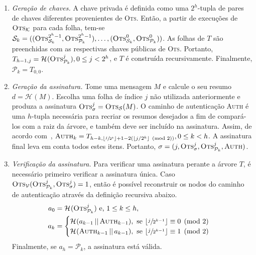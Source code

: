 \documentclass[12pt]{report}
\newcommand{\pk}{$\mathcal{P}_k$}
\newcommand{\sk}{$\mathcal{S}_k$}
\newcommand{\hash}[2][]{\mathcal{H}^{#1}(#2)}
\newcommand{\concat}{\, \vert \vert \,}
\begin{document}
\begin{enumerate}

    \item[] \emph{Geração de chaves.} A chave privada é definida como uma $2^{h}$-tupla
    de pares de chaves diferentes provenientes de \textsc{Ots}. Então, a partir de execuções de $\textsc{Ots}_\mathcal{K}$ para cada folha, tem-se $\text{\sk{}} = ((\textsc{Ots}_{\text{\sk{}}}^{2^{h} - 1}, \textsc{Ots}_{\text{\pk{}}}^{2^{h} - 1}), \dots, (\textsc{Ots}_{\text{\sk{}}}^{0}, \textsc{Ots}_{\text{\pk{}}}^{0}))$. As folhas de $T$ são preenchidas com as respectivas chaves públicas de \textsc{Ots}. Portanto, $T_{h - 1, j} = \hash{\textsc{Ots}_{\text{\pk{}}}^{j}}, 0 \leq j < 2^{h}$, e $T$ é construída recursivamente. Finalmente, $\text{\pk{}} = T_{0,0}$.
    
    \item[] \emph{Geração da assinatura.} Tome uma mensagem $M$ e calcule o seu resumo $d = \hash{M}$. Escolha
    uma folha de índice $j$ não utilizada anteriormente e produza a assinatura $\textsc{Ots}_\sigma^{j} = \textsc{Ots}_\mathcal{S}(M)$. O caminho de autenticação \textsc{Auth} é uma $h$-tupla necessária para recriar os resumos desejados a fim de compará-los com a raiz da árvore, e também deve ser incluído na assinatura. Assim, de acordo com~\cite{Bernstein:2008:PQC:1522375}, $\textsc{Auth}_k = T_{h - k, \lfloor \sfrac{j}{2^k} \rfloor + 1 - 2 (\lfloor j/2^k \rfloor \pmod{2})}, 0 \leq k < h$. A assinatura final leva em conta todos estes itens. Portanto, $\sigma = (j, \textsc{Ots}_\sigma^{j}, \textsc{Ots}_\text{\pk{}}^{j}, \textsc{Auth})$.
    
    \item[] \emph{Verificação da assinatura.} Para verificar uma assinatura perante a árvore $T$, é necessário primeiro verificar a assinatura única. Caso $\textsc{Ots}_{\mathcal{V}}(\textsc{Ots}_\text{\pk{}}^{j}, \textsc{Ots}_{\sigma}^{j}) = 1$, então é possível reconstruir os nodos do caminho de autenticação através da definição recursiva abaixo.
    \begin{equation}
        \begin{split}
        a_{0} &= \hash{\textsc{Ots}_\text{\pk{}}^{j}} \text{ e, } 1 \leq k \leq h, \\
        a_{k} &= 
        \begin{cases}
            \hash{a_{k - 1} \concat \textsc{Auth}_{k - 1}},
                \text{ se } \lfloor \sfrac{j}{2^{k - 1}} \rfloor \equiv 0 \pmod{2} \\
            \hash{\textsc{Auth}_{k - 1} \concat a_{k - 1}},
                \text{ se } \lfloor \sfrac{j}{2^{k - 1}} \rfloor \equiv 1 \pmod{2} \\
        \end{cases}
        \end{split}
    \end{equation}
    Finalmente, se $a_{h} = \text{\pk{}}$, a assinatura está válida.
    
\end{enumerate}



\end{document}
